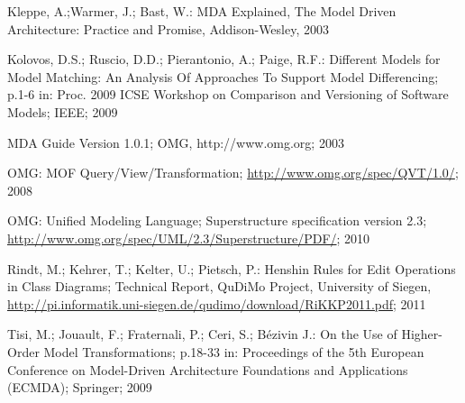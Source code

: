 \documentclass{llncs}
\begin{document}
\begin{thebibliography}{W}
Kleppe, A.;Warmer, J.; Bast, W.:
MDA Explained, The Model Driven Architecture: Practice and Promise, 
Addison-Wesley, 2003

 Kolovos, D.S.; Ruscio,
D.D.; Pierantonio, A.; Paige, R.F.: Different Models for
Model Matching: An Analysis Of Approaches To Support Model
Differencing; p.1-6 in: Proc. 2009 ICSE Workshop on
Comparison and Versioning of Software Models; IEEE; 2009

MDA Guide Version 1.0.1; OMG, http://www.omg.org; 2003

OMG: MOF Query/View/Transformation;
\url{http://www.omg.org/spec/QVT/1.0/}; 2008

OMG: Unified Modeling Language; 
Superstructure specification version 2.3; 
\url{http://www.omg.org/spec/UML/2.3/Superstructure/PDF/}; 2010




Rindt, M.; Kehrer, T.; Kelter, U.; Pietsch, P.: Henshin
Rules for Edit Operations in Class Diagrams; Technical
Report, QuDiMo Project, University of Siegen, 
\url{http://pi.informatik.uni-siegen.de/qudimo/download/RiKKP2011.pdf};
2011


Tisi, M.; Jouault, F.; Fraternali, P.; Ceri, S.; Bézivin J.:
On the Use of Higher-Order Model Transformations;
p.18-33 in: Proceedings of the 5th European Conference on
Model-Driven Architecture Foundations and Applications (ECMDA);
Springer; 2009


\end{thebibliography}
\end{document}
